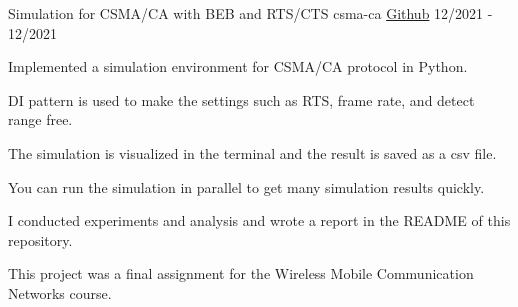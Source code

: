\cventry
{Simulation for CSMA/CA with BEB and RTS/CTS}
{csma-ca}
{\href{https://github.com/hanchchch/csma-ca}{Github}}
{12/2021 - 12/2021}
\begin{cvitems}
\item {Implemented a simulation environment for CSMA/CA protocol in Python.}
\item {DI pattern is used to make the settings such as RTS, frame rate, and detect range free.}
\item {The simulation is visualized in the terminal and the result is saved as a csv file.}
\item {You can run the simulation in parallel to get many simulation results quickly.}
\item {I conducted experiments and analysis and wrote a report in the README of this repository.}
\item {This project was a final assignment for the Wireless Mobile Communication Networks course.}
\end{cvitems}

